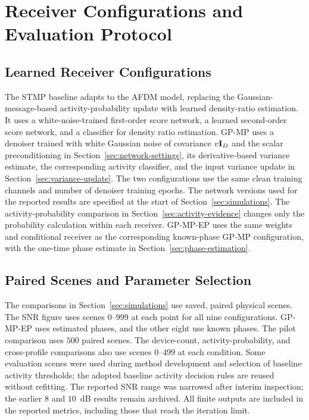 \section{Receiver Configurations and Evaluation Protocol}
\label{app:evaluation-protocol}

\subsection{Learned Receiver Configurations}
\label{app:receiver-configurations}

The STMP baseline adapts \cite{cai2026} to the AFDM model, replacing
the Gaussian-message-based activity-probability update with learned
density-ratio estimation. It uses a white-noise-trained first-order score network, a
learned second-order score network, and a classifier for density ratio estimation.
GP-MP uses a denoiser trained with white Gaussian noise of covariance
$v\mathbf{I}_D$ and the scalar preconditioning
in Section~\ref{sec:network-settings}, its derivative-based variance
estimate, the corresponding activity classifier, and the input
variance update in Section~\ref{sec:variance-update}.
The two configurations use the same clean training channels and number of
denoiser training epochs.
The network versions used for the reported results are specified
at the start of Section~\ref{sec:simulations}.
The activity-probability comparison in Section~\ref{sec:activity-evidence}
changes only the probability calculation within each receiver.
GP-MP-EP uses the same weights and conditional receiver as the
corresponding known-phase GP-MP configuration, with
the one-time phase estimate in Section~\ref{sec:phase-estimation}.

\subsection{Paired Scenes and Parameter Selection}

The comparisons in Section~\ref{sec:simulations} use saved, paired physical
scenes. The SNR figure uses scenes $0$--$999$ at each point for all
nine configurations. GP-MP-EP uses estimated phases, and the other eight
use known phases.
The pilot comparison uses $500$ paired scenes.
The device-count, activity-probability, and cross-profile
comparisons also use scenes $0$--$499$ at each condition.
Some evaluation scenes were used during method development and
selection of baseline activity thresholds; the adopted baseline activity decision rules are
reused without refitting. The reported SNR range was narrowed after
interim inspection; the earlier $8$ and $10$~dB results remain archived.
All finite outputs are included in the reported metrics, including those that
reach the iteration limit.

